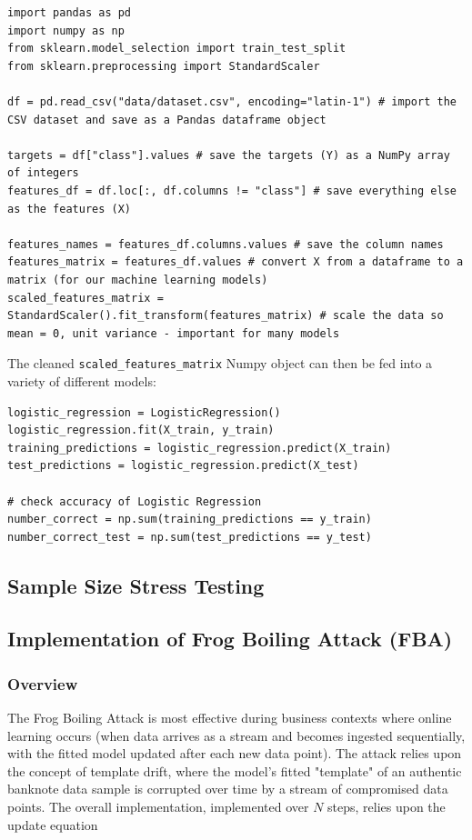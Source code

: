 \documentclass{article}
\begin{document}
\begin{lstlisting}
import pandas as pd
import numpy as np
from sklearn.model_selection import train_test_split
from sklearn.preprocessing import StandardScaler

df = pd.read_csv("data/dataset.csv", encoding="latin-1") # import the CSV dataset and save as a Pandas dataframe object
    
targets = df["class"].values # save the targets (Y) as a NumPy array of integers
features_df = df.loc[:, df.columns != "class"] # save everything else as the features (X)
    
features_names = features_df.columns.values # save the column names
features_matrix = features_df.values # convert X from a dataframe to a matrix (for our machine learning models)
scaled_features_matrix = StandardScaler().fit_transform(features_matrix) # scale the data so mean = 0, unit variance - important for many models
\end{lstlisting}

The cleaned \lstinline{scaled_features_matrix} Numpy object can then be fed into a variety of different models:

\begin{lstlisting}
logistic_regression = LogisticRegression()
logistic_regression.fit(X_train, y_train)
training_predictions = logistic_regression.predict(X_train)
test_predictions = logistic_regression.predict(X_test)

# check accuracy of Logistic Regression
number_correct = np.sum(training_predictions == y_train)
number_correct_test = np.sum(test_predictions == y_test)
\end{lstlisting}

\subsection{Sample Size Stress Testing}

\subsection{Implementation of Frog Boiling Attack (FBA)}

\subsubsection{Overview}

The Frog Boiling Attack is most effective during business contexts where online learning occurs (when data arrives as a stream and becomes ingested sequentially, with the fitted model updated after each new data point). The attack relies upon the concept of template drift\cite{template_drift}, where the model's fitted "template" of an authentic banknote data sample is corrupted over time by a stream of compromised data points. The overall implementation, implemented over $N$ steps, relies upon the update equation
\end{document}
